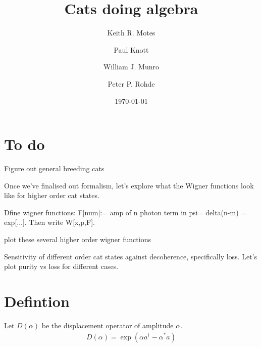 \documentclass[aps,prl,twocolumn,amsmath,amssymb,nofootinbib,superscriptaddress]{revtex4}
\begin{document}


\title{Cats doing algebra}

\author{Keith R. Motes}

\author{Paul Knott}

\author{William J. Munro}

\author{Peter P. Rohde}

\date{\today}

\frenchspacing

\begin{abstract}
\end{abstract}

\maketitle

\section{To do}

Figure out general breeding cats

Once we've finalised out formalism, let's explore what the Wigner functions look like for higher order cat states.

Dfine wigner functions: F[num]:= amp of n photon term in psi= delta(n-m) = exp[...]. Then write W[x,p,F].

plot these several higher order wigner functions

Sensitivity of different order cat states against decoherence, specifically loss. Let's plot purity vs loss for different cases.

\section{Defintion}

Let $D(\alpha)$ be the displacement operator of amplitude $\alpha$.
\begin{eqnarray}
D(\alpha) = \exp(\alpha a^\dag - \alpha^* a)
\end{eqnarray}
\end{document}

